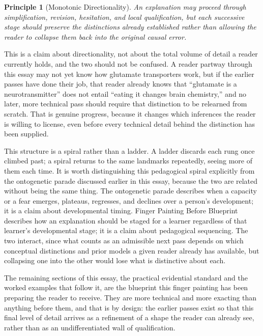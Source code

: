 \documentclass[11pt]{article}
\newtheorem*{principle}{Principle}
\begin{document}
\begin{principle}[Monotonic Directionality]
An explanation may proceed through simplification, revision, hesitation, and local qualification, but each successive stage should preserve the distinctions already established rather than allowing the reader to collapse them back into the original causal error.
\end{principle}

This is a claim about directionality, not about the total volume of detail a reader currently holds, and the two should not be confused. A reader partway through this essay may not yet know how glutamate transporters work, but if the earlier passes have done their job, that reader already knows that ``glutamate is a neurotransmitter'' does not entail ``eating it changes brain chemistry,'' and no later, more technical pass should require that distinction to be relearned from scratch. That is genuine progress, because it changes which inferences the reader is willing to license, even before every technical detail behind the distinction has been supplied.

This structure is a spiral rather than a ladder. A ladder discards each rung once climbed past; a spiral returns to the same landmarks repeatedly, seeing more of them each time. It is worth distinguishing this pedagogical spiral explicitly from the ontogenetic parade discussed earlier in this essay, because the two are related without being the same thing. The ontogenetic parade describes when a capacity or a fear emerges, plateaus, regresses, and declines over a person's development; it is a claim about developmental timing. Finger Painting Before Blueprint describes how an explanation should be staged for a learner regardless of that learner's developmental stage; it is a claim about pedagogical sequencing. The two interact, since what counts as an admissible next pass depends on which conceptual distinctions and prior models a given reader already has available, but collapsing one into the other would lose what is distinctive about each.

The remaining sections of this essay, the practical evidential standard and the worked examples that follow it, are the blueprint this finger painting has been preparing the reader to receive. They are more technical and more exacting than anything before them, and that is by design: the earlier passes exist so that this final level of detail arrives as a refinement of a shape the reader can already see, rather than as an undifferentiated wall of qualification.
\end{document}
